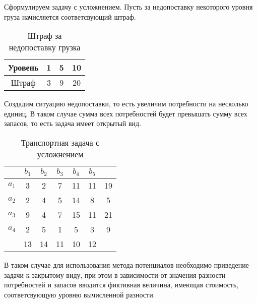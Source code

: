 \documentclass[../body.tex]{subfiles}
\begin{document}
Сформулируем задачу с усложнением. Пусть за недопоставку некоторого уровня груза начисляется соответсвующий штраф. 
\begin{table}[h]
    \centering
    \begin{tabular}{|c||c|c|c|}
        \hline
        Уровень & 1 & 5 & 10\\\hline
        Штраф & 3 & 9 & 20\\\hline
    \end{tabular}
    \caption{Штраф за недопоставку грузка}
    \label{tab:penalty}
\end{table}

Создадим ситуацию недопоставки, то есть увеличим потребности на несколько единиц. В таком случае сумма всех потребностей будет превышать сумму всех запасов, то есть задача имеет открытый вид.

\begin{table}[h]
    \centering
    \begin{tabular}{|c|c|c|c|c|c||c|}
        \hline
        & $b_1$ & $b_2$ & $b_3$ & $b_4$ & $b_5$ & \\\hline
        $a_1$ & 3 & 2 & 7 & 11 & 11 & 19\\\hline
        $a_2$ & 2 & 4 & 5 & 14 & 8 & 5\\\hline
        $a_3$ & 9 & 4 & 7 & 15 & 11 & 21\\\hline
        $a_4$ & 2 & 5 & 1 & 5 & 3 & 9\\\hline
        & 13 & 14 & 11 & 10 & 12 & \\\hline
    \end{tabular}
    \caption{Транспортная задача с усложнением}
    \label{tab:difficult_task}
\end{table}

В таком случае для использования метода потенциалов необходимо приведение задачи к закрытому виду, при этом в зависимости от значения разности потребностей и запасов вводится фиктивная величина, имеющая стоимость, соответсвующую уровню вычисленной разности. 
\end{document}
